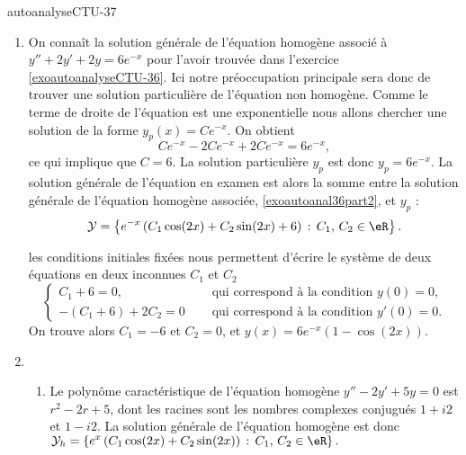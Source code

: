 
\begin{corrige}{autoanalyseCTU-37}

  \begin{enumerate}
  \item On connaît la solution générale de l'équation homogène associé à $y''+2y'+2y=6e^{-x}$ pour l'avoir trouvée dans l'exercice \ref{exoautoanalyseCTU-36}. Ici notre préoccupation principale sera donc de trouver une solution particulière de l'équation non homogène. Comme le terme de droite de l'équation est une exponentielle nous allons chercher une solution de la forme $y_p(x) =Ce^{-x} $. On obtient 
    \begin{equation*}
      Ce^{-x} -2Ce^{-x}+2Ce^{-x} = 6e^{-x}, 
    \end{equation*}
    ce qui implique que $C = 6$. La solution particulière $y_p$ est donc $y_p = 6 e^{-x}$. La solution générale de l'équation en examen est alors la somme entre la solution générale de l'équation homogène associée, \eqref{exoautoanal36part2}, et $y_p$ : 
    \begin{equation*}
      \mathcal{Y}  = \left\{ e^{-x}\left(C_1\cos(2x) +C_2\sin(2x)+ 6\right)  \,:\, C_1,\, C_2 \in \eR \right\}.
    \end{equation*} 

les conditions initiales fixées nous permettent d'écrire le système de deux équations en deux inconnues $C_1$ et $C_2$ 
\begin{equation*}
  \begin{cases}
    C_1+6= 0,  & \quad\text{ qui correspond à la condition }y(0)=0,\\
    -(C_1+6) + 2C_2 = 0 & \quad\text{ qui correspond à la condition }y'(0)=0.
  \end{cases}
\end{equation*}
On trouve alors $C_1 = -6$ et $C_2 = 0$, et $y(x) = 6e^{-x}\left(1-\cos(2x)\right)$.
   \item \begin{enumerate}
  \item Le polyn\^ome caractéristique de l'équation homogène $y''-2y'+5y=0$ est $r^2-2r+5$, dont les racines sont les nombres complexes conjugués $1+i2$ et $1-i2$. La solution générale de l'équation homogène est donc $\displaystyle \mathcal{Y}_h  = \left\{ e^{x}\left(C_1\cos(2x) +C_2\sin(2x)\right)  \,:\, C_1,\, C_2 \in \eR \right\}.$


\end{enumerate}
\end{enumerate}
\end{corrige}
